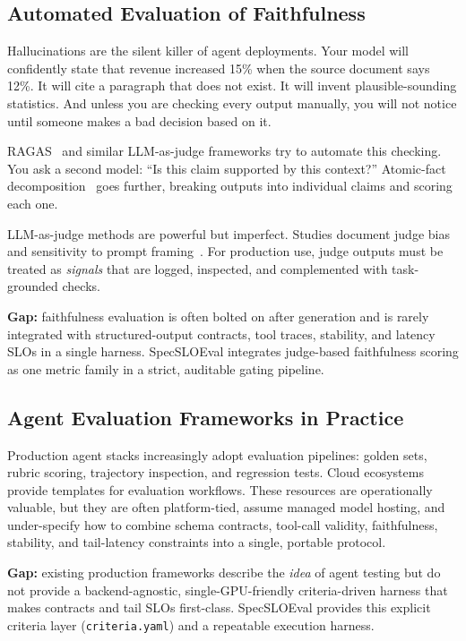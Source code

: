 \documentclass[11pt]{article}
\begin{document}
\subsection{Automated Evaluation of Faithfulness}

Hallucinations are the silent killer of agent deployments.
Your model will confidently state that revenue increased 15\% when the source document says 12\%.
It will cite a paragraph that does not exist.
It will invent plausible-sounding statistics.
And unless you are checking every output manually, you will not notice until someone makes a bad decision based on it.

RAGAS~\citep{es2023ragas} and similar LLM-as-judge frameworks try to automate this checking.
You ask a second model: ``Is this claim supported by this context?''
Atomic-fact decomposition~\citep{atomicFacts2024} goes further, breaking outputs into individual claims and scoring each one.

LLM-as-judge methods are powerful but imperfect.
Studies document judge bias and sensitivity to prompt framing~\citep{chen2024humans}.
For production use, judge outputs must be treated as \emph{signals} that are logged, inspected, and complemented with task-grounded checks.

\textbf{Gap:} faithfulness evaluation is often bolted on after generation and is rarely integrated with structured-output contracts, tool traces, stability, and latency SLOs in a single harness.
SpecSLOEval integrates judge-based faithfulness scoring as one metric family in a strict, auditable gating pipeline.

\subsection{Agent Evaluation Frameworks in Practice}

Production agent stacks increasingly adopt evaluation pipelines: golden sets, rubric scoring, trajectory inspection, and regression tests.
Cloud ecosystems provide templates for evaluation workflows.
These resources are operationally valuable, but they are often platform-tied, assume managed model hosting, and under-specify how to combine schema contracts, tool-call validity, faithfulness, stability, and tail-latency constraints into a single, portable protocol.

\textbf{Gap:} existing production frameworks describe the \emph{idea} of agent testing but do not provide a backend-agnostic, single-GPU-friendly criteria-driven harness that makes contracts and tail SLOs first-class.
SpecSLOEval provides this explicit criteria layer (\texttt{criteria.yaml}) and a repeatable execution harness.
\end{document}
